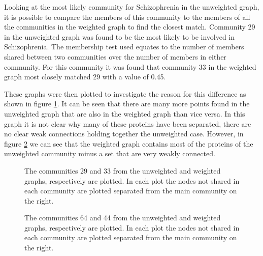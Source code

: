 Looking at the most likely community for Schizophrenia in the unweighted graph, it is possible to compare the members of this community to the members of all the communities in the weighted graph to find the closest match.
Community 29 in the unweighted graph was found to be the most likely to be involved in Schizophrenia.
The membership test used equates to the number of members shared between two communities over the number of members in either community.
For this community it was found that community 33 in the weighted graph most closely matched 29 with a value of 0.45.

These graphs were then plotted to investigate the reason for this difference as shown in figure \ref{fig:nx2933}.
It can be seen that there are many more points found in the unweighted graph that are also in the weighted graph than vice versa.
In this graph it is not clear why many of these proteins have been separated, there are no clear weak connections holding together the unweighted case.
However, in figure \ref{fig:nx6444} we can see that the weighted graph contains most of the proteins of the unweighted community minus a set that are very weakly connected.

\begin{figure}
    \centering
     \setlength\figureheight{1in}
    \setlength\figurewidth{1in}
    \setlength\figureheight{1in}
    \setlength\figurewidth{1in}
    \caption{The communities 29 and 33 from the unweighted and weighted graphs, respectively are plotted. In each plot the nodes not shared in each community are plotted separated from the main community on the right.}
    \label{fig:nx2933}
\end{figure}

\begin{figure}
    \centering
     \setlength\figureheight{1in}
    \setlength\figurewidth{1in}
    \setlength\figureheight{1in}
    \setlength\figurewidth{1in}
    \caption{The communities 64 and 44 from the unweighted and weighted graphs, respectively are plotted. In each plot the nodes not shared in each community are plotted separated from the main community on the right.}
    \label{fig:nx6444}
\end{figure}

